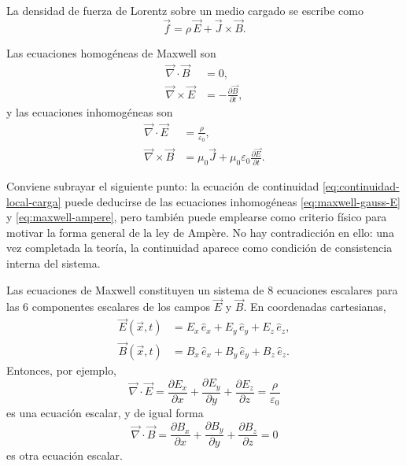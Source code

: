 \documentclass[12pt,a4paper]{article}
\theoremstyle{definition}
\theoremstyle{plain}
\numberwithin{equation}{section}
\theoremstyle{remark}
\newcommand{\E}{\vec{E}}
\newcommand{\B}{\vec{B}}
\newcommand{\J}{\vec{J}}
\begin{document}
La densidad de fuerza de Lorentz sobre un medio cargado se escribe como
\begin{equation*}
    \vec f = \rho\, \E + \J \times \B.
\end{equation*}

Las ecuaciones homogéneas de Maxwell son
\begin{align}
    \vec\nabla\cdot\B&=0,
    \label{eq:maxwell-gauss-B}\\
    \vec\nabla\times\E&=-\frac{\partial\B}{\partial t},
    \label{eq:maxwell-faraday}
\end{align}
y las ecuaciones inhomogéneas son
\begin{align}
    \vec\nabla\cdot\E&=\frac{\rho}{\varepsilon_0},
    \label{eq:maxwell-gauss-E}\\
    \vec\nabla\times\B&=\mu_0\J+\mu_0\varepsilon_0\frac{\partial\E}{\partial t}.
    \label{eq:maxwell-ampere}
\end{align}

Conviene subrayar el siguiente punto: la ecuación de continuidad \eqref{eq:continuidad-local-carga} puede deducirse de las ecuaciones inhomogéneas \eqref{eq:maxwell-gauss-E} y \eqref{eq:maxwell-ampere}, pero también puede emplearse como criterio físico para motivar la forma general de la ley de Ampère. No hay contradicción en ello: una vez completada la teoría, la continuidad aparece como condición de consistencia interna del sistema.

Las ecuaciones de Maxwell constituyen un sistema de $8$ ecuaciones escalares para las $6$ componentes escalares de los campos $\E$ y $\B$. En coordenadas cartesianas,
\begin{align*}
    \E(\vec x, t) &= E_x\,\hat e_x + E_y \, \hat e_y + E_z \,\hat e_z,\\
    \B(\vec x, t) &= B_x\,\hat e_x + B_y \, \hat e_y + B_z \,\hat e_z.
\end{align*}
Entonces, por ejemplo,
\begin{equation*}
    \vec\nabla\cdot\E=\frac{\partial E_x}{\partial x}+\frac{\partial E_y}{\partial y}+\frac{\partial E_z}{\partial z}=\frac{\rho}{\varepsilon_0}
\end{equation*}
es una ecuación escalar, y de igual forma
\begin{equation*}
    \vec\nabla\cdot\B=\frac{\partial B_x}{\partial x}+\frac{\partial B_y}{\partial y}+\frac{\partial B_z}{\partial z}=0
\end{equation*}
es otra ecuación escalar.
\end{document}
